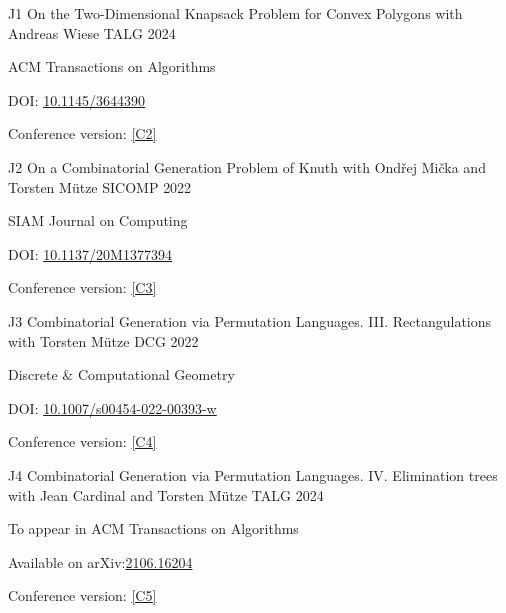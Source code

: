 
\begin{cvpublication}
	{J1}
	{On the Two-Dimensional Knapsack Problem for Convex Polygons}
	{with Andreas Wiese}
	{TALG}
	{2024}
    {
	\begin{cvitems}
	\item ACM Transactions on Algorithms
	\item[] DOI: \href{https://doi.org/10.1145/3644390}{10.1145/3644390}
	\item Conference version: \hyperlink{paperC2}{[C2]}
	\end{cvitems}
	}
\end{cvpublication}
\begin{cvpublication}
	{J2}
	{On a Combinatorial Generation Problem of Knuth}
	{with Ondřej Mička and Torsten Mütze}
	{SICOMP}
	{2022}
    {
	\begin{cvitems}
	\item SIAM Journal on Computing
	\item[] DOI: \href{https://doi.org/10.1137/20M1377394}{10.1137/20M1377394}
	\item Conference version: \hyperlink{paperC3}{[C3]}
	\end{cvitems}
	}
\end{cvpublication}
\begin{cvpublication}
	{J3}
	{Combinatorial Generation via Permutation Languages. III. Rectangulations}
	{with Torsten Mütze}
	{DCG}
	{2022}
    {
	\begin{cvitems}
	\item Discrete & Computational Geometry
	\item[] DOI: \href{https://doi.org/10.1007/s00454-022-00393-w}{10.1007/s00454-022-00393-w}
	\item Conference version: \hyperlink{paperC4}{[C4]}
	\end{cvitems}
	}
\end{cvpublication}
\begin{cvpublication}
	{J4}
	{Combinatorial Generation via Permutation Languages. IV. Elimination trees}
	{with Jean Cardinal and Torsten Mütze}
	{TALG}
	{2024}
    {
	\begin{cvitems}
	\item To appear in ACM Transactions on Algorithms
	\item[] Available on arXiv:\href{https://arxiv.org/abs/2106.16204}{2106.16204}
	\item Conference version: \hyperlink{paperC5}{[C5]}
	\end{cvitems}
	}
\end{cvpublication}
